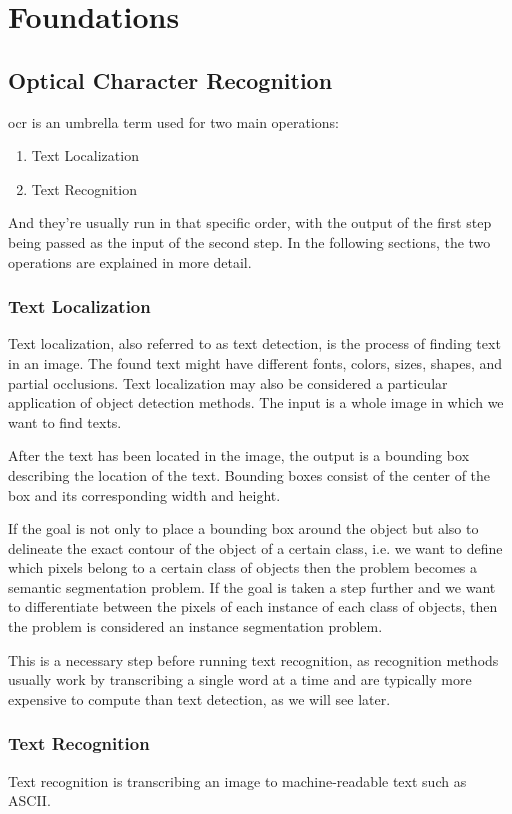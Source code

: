 \chapter{Foundations}
\label{ch:foundations}

\section{Optical Character Recognition}
\gls{ocr} is an umbrella term used for two main operations:
\begin{enumerate}
    \item Text Localization
    \item Text Recognition
\end{enumerate}
And they're usually run in that specific order, with the output of the first step being passed as the input of the second step. In the following sections, the two operations are explained in more detail.
\subsection{Text Localization}
Text localization, also referred to as text detection, is the process of finding text in an image. The found text might have different fonts, colors, sizes, shapes, and partial occlusions. Text localization may also be considered a particular application of object detection methods.
The input is a whole image in which we want to find texts.

After the text has been located in the image, the output is a bounding box describing the location of the text. Bounding boxes consist of the center of the box and its corresponding width and height.

If the goal is not only to place a bounding box around the object but also to delineate the exact contour of the object of a certain class, i.e. we want to define which pixels belong to a certain class of objects then the problem becomes a semantic segmentation problem. If the goal is taken a step further and we want to differentiate between the pixels of each instance of each class of objects, then the problem is considered an instance segmentation problem.

This is a necessary step before running text recognition, as recognition methods usually work by transcribing a single word at a time and are typically more expensive to compute than text detection, as we will see later.
\subsection{Text Recognition}
Text recognition is transcribing an image to machine-readable text such as ASCII.

